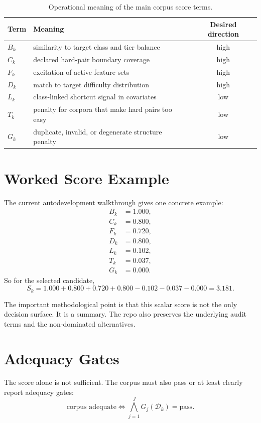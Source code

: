 \documentclass[11pt]{article}
\begin{document}
\begin{table}[htbp]
\centering
\caption{Operational meaning of the main corpus score terms.}
\label{tab:corpus_terms}
\begin{tabularx}{\textwidth}{@{}lXc@{}}
\toprule
Term & Meaning & Desired direction \\
\midrule
\(B_k\) & similarity to target class and tier balance & high \\
\(C_k\) & declared hard-pair boundary coverage & high \\
\(F_k\) & excitation of active feature sets & high \\
\(D_k\) & match to target difficulty distribution & high \\
\(L_k\) & class-linked shortcut signal in covariates & low \\
\(T_k\) & penalty for corpora that make hard pairs too easy & low \\
\(G_k\) & duplicate, invalid, or degenerate structure penalty & low \\
\bottomrule
\end{tabularx}
\end{table}

\section{Worked Score Example}
The current autodevelopment walkthrough gives one concrete example:
\begin{align}
B_k &= 1.000, \\
C_k &= 0.800, \\
F_k &= 0.720, \\
D_k &= 0.800, \\
L_k &= 0.102, \\
T_k &= 0.037, \\
G_k &= 0.000.
\end{align}
So for the selected candidate,
\begin{equation}
S_k
=
1.000 + 0.800 + 0.720 + 0.800 - 0.102 - 0.037 - 0.000
= 3.181.
\end{equation}

The important methodological point is that this scalar score is not the only decision surface. It is a summary. The repo also preserves the underlying audit terms and the non-dominated alternatives.

\section{Adequacy Gates}
The score alone is not sufficient. The corpus must also pass or at least clearly report adequacy gates:
\begin{equation}
\text{corpus adequate}
\Longleftrightarrow
\bigwedge_{j=1}^{J} G_j(\mathcal{D}_k) = \text{pass}.
\end{equation}
\end{document}
